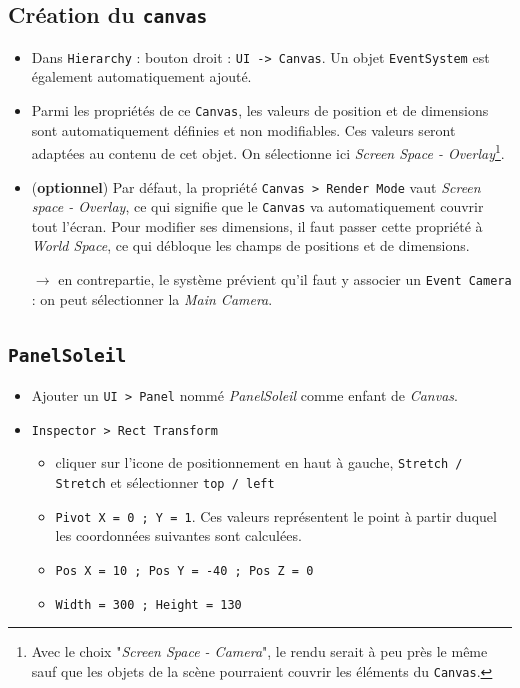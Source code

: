 \documentclass[a4paper,10pt]{article}
\newenvironment{solution}%
{\begin{tcolorbox}[breakable,colback=red!5!white,colframe=red!75!black,title=Solution]}%
{\end{tcolorbox}}
\begin{document}
\ifversionenseignant
\begin{solution}
\subsection{Création du \texttt{canvas}}
\begin{itemize}
	\item Dans \texttt{Hierarchy} : bouton droit : \texttt{UI -> Canvas}. Un objet \texttt{EventSystem} est également automatiquement ajouté.
	\item Parmi les propriétés de ce \texttt{Canvas}, les valeurs de position et de dimensions sont automatiquement définies et non modifiables. Ces valeurs seront adaptées au contenu de cet objet. On sélectionne ici \textit{Screen Space - Overlay}\footnote{Avec le choix "\textit{Screen Space - Camera}", le rendu serait à peu près le même sauf que les objets de la scène pourraient couvrir les éléments du \texttt{Canvas}.}.
	\item (\textbf{optionnel}) Par défaut, la propriété \texttt{Canvas > Render Mode} vaut \textit{Screen space - Overlay}, ce qui signifie que le \texttt{Canvas} va automatiquement couvrir tout l'écran. Pour modifier ses dimensions, il faut passer cette propriété  à \textit{World Space}, ce qui débloque les champs de positions et de dimensions.
	\item[$\rightarrow$] en contrepartie, le système prévient qu'il faut y associer un \texttt{Event Camera} : on peut sélectionner la \textit{Main Camera}.
	
\end{itemize}



\subsection{\texttt{PanelSoleil}}
\begin{itemize}
	\item Ajouter un \texttt{UI > Panel} nommé \textit{PanelSoleil} comme enfant de \textit{Canvas}. 
	\item \texttt{Inspector > Rect Transform}
	\begin{itemize}
		\item  cliquer sur l'icone de positionnement en haut à gauche, \texttt{Stretch / Stretch} et sélectionner \texttt{top / left}
	 \item \texttt{Pivot X = 0 ; Y = 1}. Ces valeurs représentent le point à partir duquel les coordonnées suivantes sont calculées.
	\item \texttt{Pos X = 10 ; Pos Y = -40 ; Pos Z = 0}
	\item \texttt{Width = 300 ; Height = 130 }
	\end{itemize}	
		
\end{itemize}
\end{solution}
\end{document}
